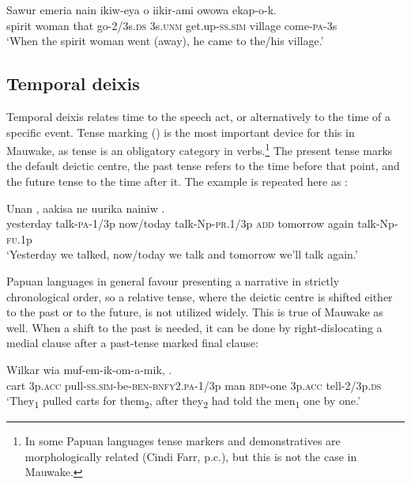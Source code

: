 \ea%
\label{ex:x1277}
\gll Sawur  emeria  nain  ikiw-eya  o  iikir-ami  owowa ekap-o-k. \\
spirit  woman  that  go-2/3s.\textsc{ds}  3s.\textsc{unm}  get.up-\textsc{ss}.\textsc{sim}  village come-\textsc{pa}-3s\\
\glt `When the spirit woman went (away), he came to the/his village.'
\z

\subsection{Temporal deixis}
{}
Temporal deixis relates time to the speech act, or alternatively to the time of a specific event. Tense marking () is the most important device for this in Mauwake, as tense is an obligatory category in verbs.\footnote{In some Papuan languages tense markers and demonstratives are morphologically related (Cindi Farr, p.c.), but this is not the case in Mauwake.} The present tense marks the default deictic centre, the past tense refers to the time before that point, and the future tense to the time after it. The example  
is repeated here as :

\ea%
\label{ex:x1893}
\gll Unan  ,  aakisa    ne uurika  nainiw  .\\
yesterday  talk-\textsc{pa}-1/3p  now/today  talk-Np-\textsc{pr}.1/3p  \textsc{add} tomorrow  again  talk-Np-\textsc{fu}.1p\\
\glt `Yesterday we talked, now/today we talk and tomorrow we'll talk again.'
\z

Papuan languages in general favour presenting a narrative in strictly chronological order, so a relative tense, where the deictic centre is shifted either to the past or to the future, is not utilized widely. This is true of Mauwake as well. When a shift to the past is needed, it can be done by right-dislocating a medial clause after a past-tense marked final clause: 

\ea%
\label{ex:x1268}
\gll Wilkar  wia  muf-em-ik-om-a-mik,       .\\
cart  3p.\textsc{acc}  pull-\textsc{ss}.\textsc{sim}-be-\textsc{ben}-\textsc{bnfy}2.\textsc{pa}-1/3p  man \textsc{rdp}-one  3p.\textsc{acc}  tell-2/3p.\textsc{ds} \\
\glt `They\textsubscript{1} pulled carts for them\textsubscript{2}, after they\textsubscript{2} had told the men\textsubscript{1} one by one.'
\z


